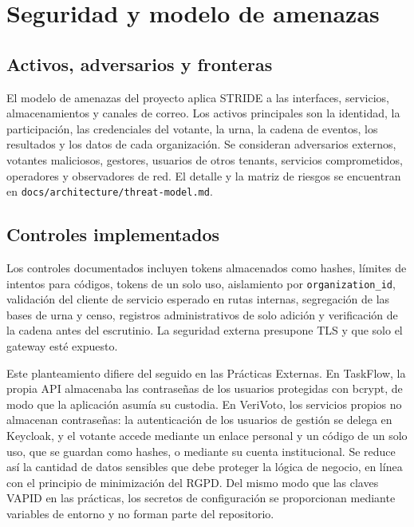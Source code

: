 \chapter{Seguridad y modelo de amenazas}
\label{cap:seguridad-amenazas}

\section{Activos, adversarios y fronteras}
El modelo de amenazas del proyecto aplica STRIDE a las interfaces, servicios,
almacenamientos y canales de correo. Los activos principales son la identidad,
la participación, las credenciales del votante, la urna, la cadena de eventos,
los resultados y los datos de cada organización. Se consideran adversarios
externos, votantes maliciosos, gestores, usuarios de otros tenants, servicios
comprometidos, operadores y observadores de red. El detalle y la matriz de
riesgos se encuentran en \texttt{docs/architecture/threat-model.md}.

\section{Controles implementados}
Los controles documentados incluyen tokens almacenados como hashes, límites
de intentos para códigos, tokens de un solo uso, aislamiento por
\texttt{organization\_id}, validación del cliente de servicio esperado en
rutas internas, segregación de las bases de urna y censo, registros
administrativos de solo adición y verificación de la cadena antes del
escrutinio. La seguridad externa presupone TLS y que solo el gateway esté
expuesto.

Este planteamiento difiere del seguido en las Prácticas Externas. En
TaskFlow, la propia API almacenaba las contraseñas de los usuarios protegidas
con bcrypt, de modo que la aplicación asumía su custodia. En VeriVoto, los
servicios propios no almacenan contraseñas: la autenticación de los usuarios
de gestión se delega en Keycloak, y el votante accede mediante un enlace
personal y un código de un solo uso, que se guardan como hashes, o mediante su
cuenta institucional. Se reduce así la cantidad de datos sensibles que debe
proteger la lógica de negocio, en línea con el principio de minimización del
RGPD. Del mismo modo que las claves VAPID en las prácticas, los secretos de
configuración se proporcionan mediante variables de entorno y no forman parte
del repositorio.

